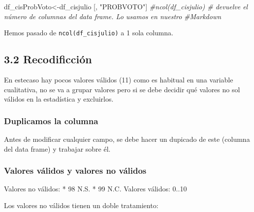 \documentclass[
]{article}
\newenvironment{Shaded}{\begin{snugshade}}{\end{snugshade}}
\newcommand{\CommentTok}[1]{\textcolor[rgb]{0.56,0.35,0.01}{\textit{#1}}}
\newcommand{\NormalTok}[1]{#1}
\newcommand{\OtherTok}[1]{\textcolor[rgb]{0.56,0.35,0.01}{#1}}
\newcommand{\SpecialCharTok}[1]{\textcolor[rgb]{0.81,0.36,0.00}{\textbf{#1}}}
\newcommand{\StringTok}[1]{\textcolor[rgb]{0.31,0.60,0.02}{#1}}
\begin{document}
\begin{Shaded}
\begin{Highlighting}[]
\NormalTok{df\_cisProbVoto}\OtherTok{\textless{}{-}}\NormalTok{df\_cisjulio [, }\StringTok{"PROBVOTO"}\NormalTok{]}
\CommentTok{\#ncol(df\_cisjulio) \# devuelve el número de columnas del data frame. Lo usamos en nuestro}
\CommentTok{\#Markdown}
\end{Highlighting}
\end{Shaded}

Hemos pasado de \texttt{ncol(df\_cisjulio)} a 1 sola columna.

\hypertarget{recodificciuxf3n}{%
\subsection{3.2 Recodificción}\label{recodificciuxf3n}}

En estecaso hay pocos valores válidos (11) como es habitual en una
variable cualitativa, no se va a grupar valores pero si se debe decidir
qué valores no sol válidos en la estadística y excluirlos.

\hypertarget{duplicamos-la-columna}{%
\subsubsection{Duplicamos la columna}\label{duplicamos-la-columna}}

Antes de modificar cualquier campo, se debe hacer un dupicado de este
(columna del data frame) y trabajar sobre él.

\begin{Shaded}
\end{Shaded}

\hypertarget{valores-vuxe1lidos-y-valores-no-vuxe1lidos}{%
\subsubsection{Valores válidos y valores no
válidos}\label{valores-vuxe1lidos-y-valores-no-vuxe1lidos}}

Valores no válidos: * 98 N.S. * 99 N.C. Valores válidos: 0..10

Los valores no válidos tienen un doble tratamiento:
\end{document}
